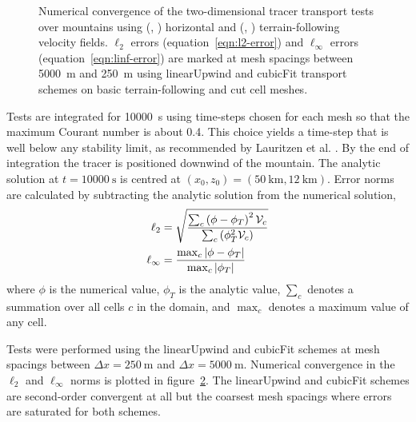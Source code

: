 \begin{figure}
	\centering
	\begin{subfigure}{\textwidth}
		
		\label{fig:cubicFit:schaerAdvect:convergence:l2}
		\label{fig:cubicFit:schaerAdvect:convergence:linf}
		\label{fig:cubicFit:tfAdvect:convergence:l2}
		\label{fig:cubicFit:tfAdvect:convergence:linf}
	\end{subfigure}
%
	\caption{Numerical convergence of the two-dimensional tracer transport tests over mountains using
	(, ) horizontal and
	(, ) terrain-following velocity fields.
	$\ell_2$ errors (equation~\ref{eqn:l2-error}) and $\ell_\infty$ errors (equation~\ref{eqn:linf-error}) are marked at mesh spacings between \SI{5000}{\meter} and \SI{250}{\meter} using linearUpwind and cubicFit transport schemes on basic terrain-following and cut cell meshes.}
	\label{fig:cubicFit:schaerAdvect:convergence}
\end{figure}

Tests are integrated for \SI{10000}{\second} using time-steps chosen for each mesh so that the maximum Courant number is about \num[round-mode=off]{0.4}.  This choice yields a time-step that is well below any stability limit, as recommended by Lauritzen et al. \citep{lauritzen2012}.  By the end of integration the tracer is positioned downwind of the mountain.
The analytic solution at $t = \SI{10000}{\second}$ is centred at $(x_0, z_0) = (\SI{50}{\kilo\meter}, \SI{12}{\kilo\meter})$.
Error norms are calculated by subtracting the analytic solution from the numerical solution,
\begin{align}
	\ell_2 &= \sqrt{\frac{\sum_c \left(\phi - \phi_T \right)^2 \mathcal{V}_c}{\sum_c \left(\phi_T^2 \mathcal{V}_c \right)}} \label{eqn:l2-error} \\
	\ell_\infty &= \frac{\max_c \left\lvert \phi - \phi_T \right\rvert}{\max_c \left\lvert \phi_T \right\rvert} \label{eqn:linf-error}
\end{align}
where $\phi$ is the numerical value, $\phi_T$ is the analytic value, $\sum_c$ denotes a summation over all cells $c$ in the domain, and $\max_c$ denotes a maximum value of any cell.

Tests were performed using the linearUpwind and cubicFit schemes at mesh spacings between $\Delta x = \SI{250}{\meter}$ and $\Delta x = \SI{5000}{\meter}$.
Numerical convergence in the $\ell_2$ and $\ell_\infty$ norms is plotted in figure~\ref{fig:cubicFit:schaerAdvect:convergence}.
The linearUpwind and cubicFit schemes are second-order convergent at all but the coarsest mesh spacings where errors are saturated for both schemes.


